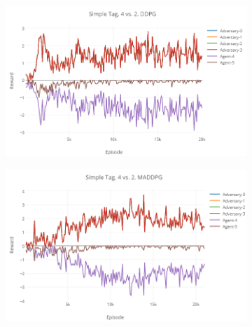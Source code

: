 \begin{figure}[!htbp]
    \begin{subfigure}[t]{\dimexpr.5\linewidth-1.3em\relax} %
        \includegraphics[height=0.20\textheight,valign=t]{my_folder/images/ch5/st-4vs2-ddpg.png} %
    \end{subfigure}
    \begin{subfigure}[t]{\dimexpr.5\linewidth-1.3em\relax}%
        \includegraphics[height=0.20\textheight,valign=t]{my_folder/images/ch5/st-4vs2-maddpg.png}%
    \end{subfigure}

\end{figure}
